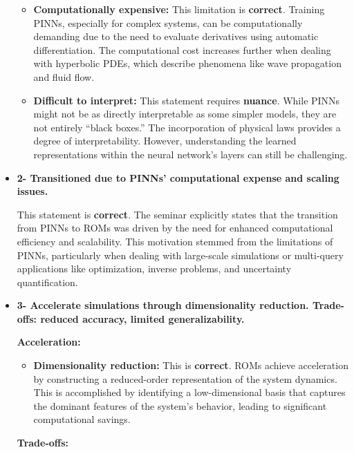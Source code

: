 \documentclass[
]{article}
\begin{document}
\begin{itemize}
\begin{itemize}
  \item
    \textbf{Computationally expensive:} This limitation is
    \textbf{correct}. Training PINNs, especially for complex systems,
    can be computationally demanding due to the need to evaluate
    derivatives using automatic differentiation. The computational cost
    increases further when dealing with hyperbolic PDEs, which describe
    phenomena like wave propagation and fluid flow.
  \item
    \textbf{Difficult to interpret:} This statement requires
    \textbf{nuance}. While PINNs might not be as directly interpretable
    as some simpler models, they are not entirely ``black boxes.'' The
    incorporation of physical laws provides a degree of
    interpretability. However, understanding the learned representations
    within the neural network's layers can still be challenging.
  \end{itemize}
\item
  \textbf{2- Transitioned due to PINNs' computational expense and
  scaling issues.}

  This statement is \textbf{correct}. The seminar explicitly states that
  the transition from PINNs to ROMs was driven by the need for enhanced
  computational efficiency and scalability. This motivation stemmed from
  the limitations of PINNs, particularly when dealing with large-scale
  simulations or multi-query applications like optimization, inverse
  problems, and uncertainty quantification.
\item
  \textbf{3- Accelerate simulations through dimensionality reduction.
  Trade-offs: reduced accuracy, limited generalizability.}

  \textbf{Acceleration:}

  \begin{itemize}
  
  \item
    \textbf{Dimensionality reduction:} This is \textbf{correct}. ROMs
    achieve acceleration by constructing a reduced-order representation
    of the system dynamics. This is accomplished by identifying a
    low-dimensional basis that captures the dominant features of the
    system's behavior, leading to significant computational savings.
  \end{itemize}

  \textbf{Trade-offs:}

  \begin{itemize}
  

\end{itemize}
\end{itemize}
\end{document}
